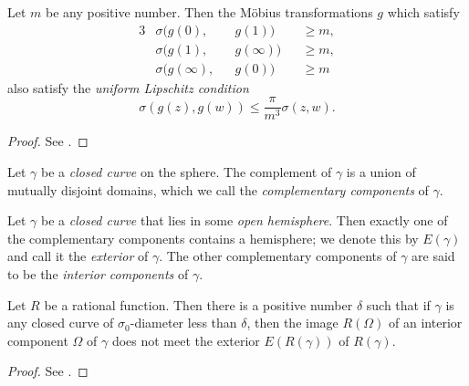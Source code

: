 \begin{theorem}
    Let $m$ be any positive number. Then the Möbius transformations $g$ which
    satisfy
    \begin{alignat*}{3}
        &\sigma(g(0),      &&g(1))      &&\geq m, \\
        &\sigma(g(1),      &&g(\infty)) &&\geq m, \\
        &\sigma(g(\infty), &&g(0))      &&\geq m
    \end{alignat*}
    also satisfy the \emph{uniform Lipschitz condition}
    \begin{equation*}
        \sigma(g(z), g(w)) \leq \frac{\pi}{m^3} \sigma(z, w).
    \end{equation*}
\end{theorem}
\begin{proof}
    See \cite[34--35]{Beardon1991}.
\end{proof}

\begin{definition}
    Let $\gamma$ be a \emph{closed curve} on the sphere. The complement of
    $\gamma$ is a union of mutually disjoint domains, which we call the
    \emph{complementary components} of $\gamma$.
\end{definition}

\begin{definition}
    Let $\gamma$ be a \emph{closed curve} that lies in some \emph{open
    hemisphere}. Then exactly one of the complementary components contains a
    hemisphere; we denote this by $E(\gamma)$ and call it the \emph{exterior} of
    $\gamma$. The other complementary components of $\gamma$ are said to be the
    \emph{interior components} of $\gamma$.
\end{definition}

\begin{theorem}
    \label{thm:interior_components_mapping_theorem_for_rational_maps}
    Let $R$ be a rational function. Then there is a positive number $\delta$
    such that if $\gamma$ is any closed curve of $\sigma_0$-diameter less than
    $\delta$, then the image $R(\Omega)$ of an interior component $\Omega$ of
    $\gamma$ does not meet the exterior $E(R(\gamma))$ of $R(\gamma)$.
\end{theorem}
\begin{proof}
    See \cite[35--36]{Beardon1991}.
\end{proof}

